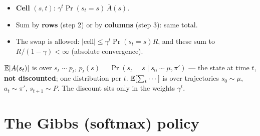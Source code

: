 \begin{minipage}[c]{0.45\linewidth}
\centering
{}
\end{minipage}\hfill
\begin{minipage}[c]{0.52\linewidth}
\begin{itemize}
  \item \textbf{Cell} $(s,t)$: $\gamma^t\Pr(s_t{=}s)\,\bar A(s)$.
  \item Sum by \textcolor{AtlasWarm}{\textbf{rows}} (step 2) or by \textcolor{AtlasSlate}{\textbf{columns}} (step 3): same total.
  \item The swap is allowed: $|\text{cell}|\le\gamma^t\Pr(s_t{=}s)R$, and these sum to $R/(1-\gamma)<\infty$ (absolute convergence).
\end{itemize}
\end{minipage}

\begin{notebox}
$\mathbb{E}[\bar A(s_t)]$ is over $s_t\sim p_t$, $p_t(s)=\Pr(s_t{=}s\mid s_0\sim\mu,\pi')$ --- the state at time $t$, \textbf{not discounted}; one distribution per $t$. $\mathbb{E}[\sum_t\cdots]$ is over trajectories $s_0\sim\mu$, $a_t\sim\pi'$, $s_{t+1}\sim P$. The discount sits only in the weights $\gamma^t$.
\end{notebox}

\section{The Gibbs (softmax) policy}
\label{app:gibbs}


